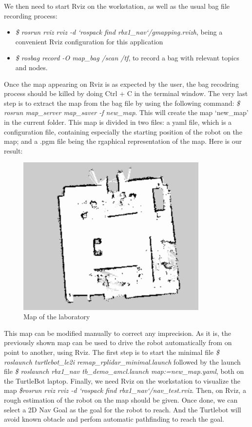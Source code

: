 \documentclass[aps,letterpaper,11pt]{revtex4}
\begin{document}
We then need to start Rviz on the workstation, as well as the usual bag file recording process:
\begin{itemize}
  \item \textit{\$ rosrun rviz rviz -d `rospack find rbx1\_nav`/gmapping.rvizh}, being a convenient Rviz configuration for this application
  \item \textit{\$ rosbag record -O map\_bag /scan /tf}, to record a bag with relevant topics and nodes.
\end{itemize}

Once the map appearing on Rviz is as expected by the user, the bag recodring process should be killed by doing Ctrl + C in the terminal window. 
The very last step is to extract the map from the bag file by using the following command: \textit{\$ rosrun map\_server map\_saver -f new\_map}. This will create the map `new\_map' in the current folder. This map is divided in two files: a yaml file, which is a configuration file, containing especially the starting position of the robot on the map; and a .pgm file being the rgaphical representation of the map. Here is our result:

\begin{figure}[H]
	\centering
	\includegraphics[height=8cm]{finalmap.png}
	\caption{Map of the laboratory}
	\label{fig: map}    
\end{figure} 

This map can be modified manually to correct any imprecision. As it is, the previously shown map can be used to drive the robot automatically from on point to another, using Rviz. The first step is to start the minimal file \textit{\$ roslaunch turtlebot\_le2i  remap\_rplidar\_minimal.launch} followed by the launch file \textit{\$ roslaunch rbx1\_nav tb\_demo\_amcl.launch map:=new\_map.yaml}, both on the TurtleBot laptop. Finally, we need Rviz on the workstation to visualize the map \textit{\$rosrun rviz rviz -d `rospack find rbx1\_nav`/nav\_test.rviz}. Then, on Rviz, a rough estimation of the robot on the map should be given. Once done, we can select a 2D Nav Goal as the goal for the robot to reach. And the Turtlebot will avoid known obtacle and perfom automatic pathfinding to reach the goal. 
\end{document}
